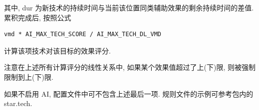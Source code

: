 \documentclass[UTF8, zihao=-4]{ctexart} %
\begin{document}
\begin{enumerate}
\begin{itemize}
\begin{description}
                                    其中, dur 为新技术的持续时间与当前该位置同类辅助效果的剩余持续时间的差值.
                                    累积完成后, 按照公式
                                    \begin{lstlisting}
vmd * AI_MAX_TECH_SCORE / AI_MAX_TECH_DL_VMD
                                    \end{lstlisting}
                                    计算该项技术对该目标的效果评分.
                        \end{description}
            \end{itemize}
            注意在上述所有计算评分的线性关系中, 如果某个效果值超过了上(下)限, 则被强制限制到上(下)限.
\end{enumerate}
如果不启用 AI, 配置文件中可不包含上述最后一项. 规则文件的示例可参考包内的 star.tech.
\end{document}
